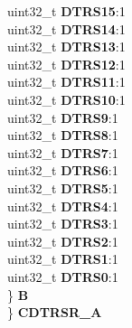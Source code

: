 \begin{DoxyCompactItemize}
\begin{tabbing}
\>\>uint32\_t {\bfseries DTRS15}:1\\
\>\>uint32\_t {\bfseries DTRS14}:1\\
\>\>uint32\_t {\bfseries DTRS13}:1\\
\>\>uint32\_t {\bfseries DTRS12}:1\\
\>\>uint32\_t {\bfseries DTRS11}:1\\
\>\>uint32\_t {\bfseries DTRS10}:1\\
\>\>uint32\_t {\bfseries DTRS9}:1\\
\>\>uint32\_t {\bfseries DTRS8}:1\\
\>\>uint32\_t {\bfseries DTRS7}:1\\
\>\>uint32\_t {\bfseries DTRS6}:1\\
\>\>uint32\_t {\bfseries DTRS5}:1\\
\>\>uint32\_t {\bfseries DTRS4}:1\\
\>\>uint32\_t {\bfseries DTRS3}:1\\
\>\>uint32\_t {\bfseries DTRS2}:1\\
\>\>uint32\_t {\bfseries DTRS1}:1\\
\>\>uint32\_t {\bfseries DTRS0}:1\\
\>\} {\bfseries B}\\
\} {\bfseries CDTRSR\_A}\\


\end{tabbing}
\end{DoxyCompactItemize}
